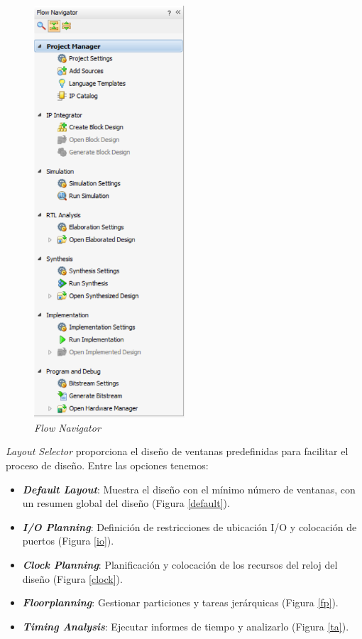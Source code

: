 \begin{figure}[H]
    \centering
    \includegraphics[width = 0.5\textwidth]{imagenes/flownavigator.png}
    \caption{\textit{Flow Navigator}}\label{flownavigator}
\end{figure}

\textit{Layout Selector} proporciona el diseño de ventanas predefinidas para facilitar el proceso de diseño. Entre las opciones tenemos:
\begin{itemize}
    \item \textit{\textbf{Default Layout}}: Muestra el diseño con el mínimo número de ventanas, con un resumen global del diseño (Figura \ref{default}).
    \item \textit{\textbf{I/O Planning}}: Definición de restricciones de ubicación I/O y colocación de puertos (Figura \ref{io}).
    \item \textit{\textbf{Clock Planning}}: Planificación y colocación de los recursos del reloj del diseño (Figura \ref{clock}).
    \item \textit{\textbf{Floorplanning}}: Gestionar particiones y tareas jerárquicas (Figura \ref{fp}).
    \item \textit{\textbf{Timing Analysis}}: Ejecutar informes de tiempo y analizarlo (Figura \ref{ta}).
\end{itemize} 

